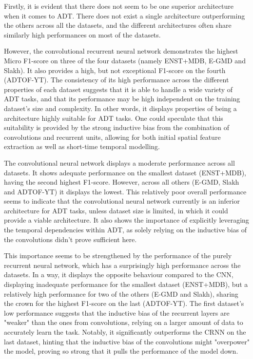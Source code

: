 Firstly, it is evident that there does not seem to be one superior architecture when it comes to \gls{ADT}. There does not exist a single architecture outperforming the others across all the datasets, and the different architectures often share similarly high performances on most of the datasets. 

However, the convolutional recurrent neural network demonstrates the highest Micro F1-score on three of the four datasets (namely ENST+MDB, E-GMD and Slakh). It also provides a high, but not exceptional F1-score on the fourth (ADTOF-YT). The consistency of its high performance across the different properties of each dataset suggests that it is able to handle a wide variety of \gls{ADT} tasks, and that its performance may be high independent on the training dataset's size and complexity. In other words, it displays properties of being a architecture highly suitable for \gls{ADT} tasks. One could speculate that this suitability is provided by the strong inductive bias from the combination of convolutions and recurrent units, allowing for both initial spatial feature extraction as well as short-time temporal modelling.

The convolutional neural network displays a moderate performance across all datasets. It shows adequate performance on the smallest dataset (ENST+MDB), having the second highest F1-score. However, across all others (E-GMD, Slakh and ADTOF-YT) it displays the lowest. This relatively poor overall performance seems to indicate that the convolutional neural network currently is an inferior architecture for \gls{ADT} tasks, unless dataset size is limited, in which it could provide a viable architecture. It also shows the importance of explicitly leveraging the temporal dependencies within \gls{ADT}, as solely relying on the inductive bias of the convolutions didn't prove sufficient here.

This importance seems to be strengthened by the performance of the purely recurrent neural network, which has a surprisingly high performance across the datasets. In a way, it displays the opposite behaviour compared to the \gls{CNN}, displaying inadequate performance for the smallest dataset (ENST+MDB), but a relatively high performance for two of the others (E-GMD and Slakh), sharing the crown for the highest F1-score on the last (ADTOF-YT). The first dataset's low performance suggests that the inductive bias of the recurrent layers are "weaker" than the ones from convolutions, relying on a larger amount of data to accurately learn the task. Notably, it significantly outperforms the \gls{CRNN} on the last dataset, hinting that the inductive bias of the convolutions might "overpower" the model, proving so strong that it pulls the performance of the model down.

